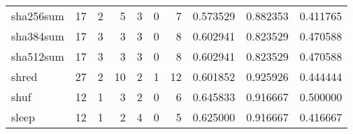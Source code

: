 \begin{tabular}{lrrrrrrrrr}
sha256sum &                                      17 &                                                  2 &                                                  5 &                                                  3 &                                                  0 &                                                  7 &                                           0.573529 &                               0.882353 &                             0.411765 \\
sha384sum &                                      17 &                                                  3 &                                                  3 &                                                  3 &                                                  0 &                                                  8 &                                           0.602941 &                               0.823529 &                             0.470588 \\
sha512sum &                                      17 &                                                  3 &                                                  3 &                                                  3 &                                                  0 &                                                  8 &                                           0.602941 &                               0.823529 &                             0.470588 \\
shred     &                                      27 &                                                  2 &                                                 10 &                                                  2 &                                                  1 &                                                 12 &                                           0.601852 &                               0.925926 &                             0.444444 \\
shuf      &                                      12 &                                                  1 &                                                  3 &                                                  2 &                                                  0 &                                                  6 &                                           0.645833 &                               0.916667 &                             0.500000 \\
sleep     &                                      12 &                                                  1 &                                                  2 &                                                  4 &                                                  0 &                                                  5 &                                           0.625000 &                               0.916667 &                             0.416667 \\

\end{tabular}

